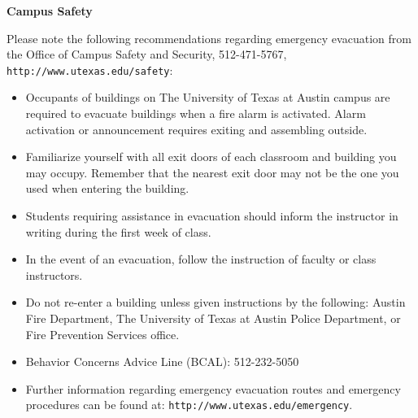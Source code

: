 \documentclass[11pt]{article}
\begin{document}
\vspace{3mm}
\textbf{\large Campus Safety}

Please note the following recommendations regarding emergency evacuation from the Office of Campus Safety and Security, 512-471-5767, \texttt{http://www.utexas.edu/safety}:
\begin{itemize}
\item Occupants of buildings on The University of Texas at Austin campus are required to evacuate buildings when a fire alarm is activated.  Alarm activation or announcement requires exiting and assembling outside.
\item Familiarize yourself with all exit doors of each classroom and building you may occupy.  Remember that the nearest exit door may not be the one you used when entering the building.
\item Students requiring assistance in evacuation should inform the instructor in writing during the first week of class.
\item In the event of an evacuation, follow the instruction of faculty or class instructors.
\item Do not re-enter a building unless given instructions by the following: Austin Fire Department, The University of Texas at Austin Police Department, or Fire Prevention Services office.
\item Behavior Concerns Advice Line (BCAL):  512-232-5050
\item Further information regarding emergency evacuation routes and emergency procedures can be found at: \texttt{http://www.utexas.edu/emergency}.
\end{itemize}
\end{document}
